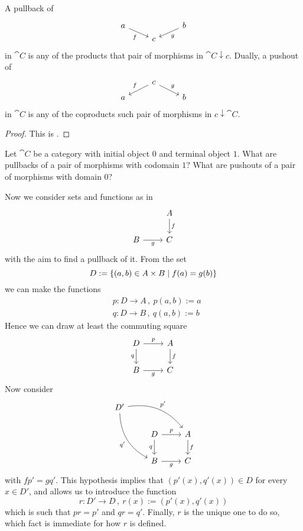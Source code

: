 \begin{proposition}
A pullback of
\[\begin{tikzcd}[row sep=tiny]
a \ar["f", dr, swap] &   & b \ar["g", dl] \\
                     & c &
\end{tikzcd}\]
in \(\cat C\) is any of the products that pair of morphisms in \(\cat C {\downarrow} c\). Dually, a pushout of
\[\begin{tikzcd}[row sep=tiny]
& c \ar["f", dl, swap] \ar["g", dr] & \\
a & & b
\end{tikzcd}\]
in \(\cat C\) is any of the coproducts such pair of morphisms in \(c {\downarrow} \cat C\).
\end{proposition}

\begin{proof}
This is .
\end{proof}

\begin{exercise}
Let \(\cat C\) be a category with initial object \(0\) and terminal object \(1\). What are pullbacks of a pair of morphisms with codomain \(1\)? What are pushouts of a pair of morphisms with domain \(0\)?
\end{exercise}

\begin{example}\label{example:PullbacksInSet}
Now we consider sets and functions as in
\[\begin{tikzcd}
                    & A \ar["f", d] \\
B \ar["g", r, swap] & C
\end{tikzcd}\]
with the aim to find a pullback of it. From the set
\[D := \left\{(a, b) \in A \times B \mid f(a) = g(b)\right\}\]
we can make the functions
\begin{align*}
& p : D \to A\,, \ p(a, b) := a \\
& q : D \to B\,, \ q(a, b) := b
\end{align*}
Hence we can draw at least the commuting square
\[\begin{tikzcd}
D \ar["p", r] \ar["q", d, swap] & A \ar["f", d] \\
B \ar["g", r, swap]             & C
\end{tikzcd}\]
Now consider
\[\begin{tikzcd}
D' \ar["{p'}", drr, bend left] \ar["{q'}", ddr, bend right, swap]                 \\
& D \ar["p", r] \ar["q", d, swap]                                & A \ar["f", d] \\
& B \ar["g", r, swap]                                            & C
\end{tikzcd}\]
with \(fp' = gq'\). This hypothesis implies that \(\left(p'(x), q'(x)\right) \in D\) for every \(x \in D'\), and allows us to introduce the function
\[r : D' \to D\,, \ r(x) := \left(p'(x), q'(x)\right)\]
which is such that \(p r = p'\) and \(q r = q'\). Finally, \(r\) is the unique one to do so, which fact is immediate for how \(r\) is defined.
\end{example}


